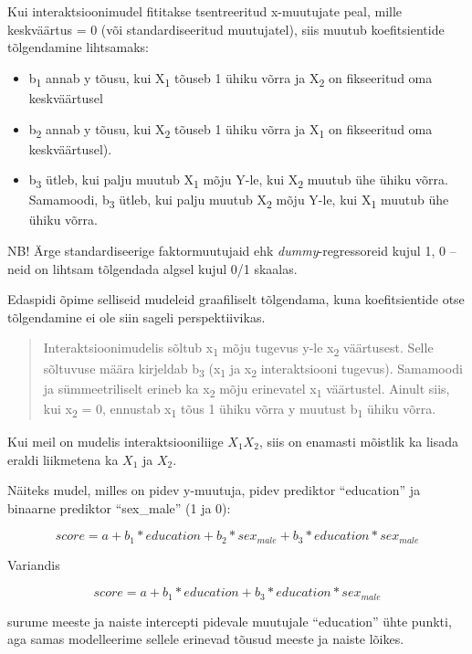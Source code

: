 \documentclass[]{book}
\begin{document}
Kui interaktsioonimudel fititakse tsentreeritud x-muutujate peal, mille
keskväärtus = 0 (või standardiseeritud muutujatel), siis muutub
koefitsientide tõlgendamine lihtsamaks:

\begin{itemize}
\item
  b\textsubscript{1} annab y tõusu, kui X\textsubscript{1} tõuseb 1
  ühiku võrra ja X\textsubscript{2} on fikseeritud oma keskväärtusel
\item
  b\textsubscript{2} annab y tõusu, kui X\textsubscript{2} tõuseb 1
  ühiku võrra ja X\textsubscript{1} on fikseeritud oma keskväärtusel).
\item
  b\textsubscript{3} ütleb, kui palju muutub X\textsubscript{1} mõju
  Y-le, kui X\textsubscript{2} muutub ühe ühiku võrra. Samamoodi,
  b\textsubscript{3} ütleb, kui palju muutub X\textsubscript{2} mõju
  Y-le, kui X\textsubscript{1} muutub ühe ühiku võrra.
\end{itemize}

NB! Ärge standardiseerige faktormuutujaid ehk \emph{dummy}-regressoreid
kujul 1, 0 -- neid on lihtsam tõlgendada algsel kujul 0/1 skaalas.

Edaspidi õpime selliseid mudeleid graafiliselt tõlgendama, kuna
koefitsientide otse tõlgendamine ei ole siin sageli perspektiivikas.

\begin{quote}
Interaktsioonimudelis sõltub x\textsubscript{1} mõju tugevus y-le
x\textsubscript{2} väärtusest. Selle sõltuvuse määra kirjeldab
b\textsubscript{3} (x\textsubscript{1} ja x\textsubscript{2}
interaktsiooni tugevus). Samamoodi ja sümmeetriliselt erineb ka
x\textsubscript{2} mõju erinevatel x\textsubscript{1} väärtustel. Ainult
siis, kui x\textsubscript{2} = 0, ennustab x\textsubscript{1} tõus 1
ühiku võrra y muutust b\textsubscript{1} ühiku võrra.
\end{quote}

Kui meil on mudelis interaktsiooniliige \(X_1X_2\), siis on enamasti
mõistlik ka lisada eraldi liikmetena ka \(X_1\) ja \(X_2\).

Näiteks mudel, milles on pidev y-muutuja, pidev prediktor ``education''
ja binaarne prediktor ``sex\_male'' (1 ja 0):

\[score = a + b_1 * education + b_2 * sex_{male} + b_3 * education * sex_{male}\]

Variandis

\[score = a + b_1 * education + b_3 * education * sex_{male}\]

surume meeste ja naiste intercepti pidevale muutujale ``education'' ühte
punkti, aga samas modelleerime sellele erinevad tõusud meeste ja naiste
lõikes.
\end{document}
